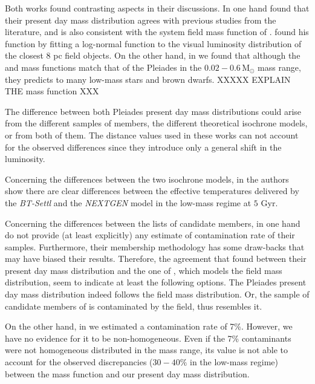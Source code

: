 Both works found contrasting aspects in their discussions. In one hand \citet{Lodieu2012} found that their present day mass distribution agrees with previous studies from the literature, and is also consistent with the system field mass function of \citet{Chabrier2005}. \citet{Chabrier2005} found his function by fitting a log-normal function to the visual luminosity distribution of the closest $8$ pc field objects. On the other hand, in \citet{Bouy2015} we found that although the \citet{Chabrier2005} and \citet{Thies2007} mass functions match that of the Pleiades in the $0.02-0.6\,\mathrm{M_{\odot}}$ mass range, they predicts to many low-mass stars and brown dwarfs. XXXXX EXPLAIN THE \citet{Thies2007} mass function XXX

The difference between both Pleiades present day mass distributions could arise from the different samples of members,  the different theoretical isochrone models, or from both of them. The distance values used in these works can not account for the observed differences since they introduce only a general shift in the luminosity. 

Concerning the differences between the two isochrone models, in \citet{2013MmSAI..84.1053A} the authors show there are clear differences between the effective temperatures delivered by the \emph{BT-Settl} and the \emph{NEXTGEN} model in the low-mass regime at $5$ Gyr.  

Concerning the differences between the lists of candidate members, in one hand \citet{Lodieu2012} do not provide (at least explicitly) any estimate of contamination rate of their samples. Furthermore, their membership methodology has some draw-backs \cite[see][]{Sarro2014} that may have biased their results. Therefore, the agreement that \citet{Lodieu2012} found between their present day mass distribution and the one of \citet{Chabrier2005}, which models the field mass distribution, seem to indicate at least the following options. The Pleiades present day mass distribution indeed follows the field mass distribution. Or, the sample of candidate members of \citet{Lodieu2012} is contaminated by the field, thus resembles it.  

On the other hand, in \citet{Bouy2015} we estimated a contamination rate of 7\%. However, we have no evidence for it to be non-homogeneous. Even if the 7\% contaminants were not homogeneous distributed in the mass range, its value is not able to account for the observed discrepancies ($30-40\%$ in the low-mass regime) between the \citet{Chabrier2005} mass function and our present day mass distribution.


